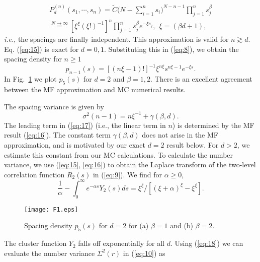\documentclass[reprint,amsmath,amssymb,showpacs,aps,]{revtex4-1}
\begin{document}
{\begin{eqnarray}\label{eq:15}
P_{d}^{(n)}(s_{1},\cdots,s_{n})= \tilde{C} \Big(N-\sum_{i=1}^{n}s_{i}\Big)^{N-n-1}\prod_{j=1}^{n}s_{j}^{\beta}\nonumber \\
\overset{N\rightarrow\infty}{=}\left[\xi^{\xi}(\xi!)^{-1}\right]^{n} \prod_{j=1}^{n} s_{j}^{\beta}e^{-\xi s_{j}}, ~~ \xi= (\beta d+1),
\end{eqnarray}
\textit{i.e.}, the spacings are finally independent. This approximation is valid for $n \gtrsim d$. Eq. (\ref{eq:15}) is exact for $d=0,1$. Substituting this in (\ref{eq:8}), we obtain the spacing density for $n\geq1$
\begin{equation}\label{eq:16}
p_{n-1}(s)= \left[(n\xi-1)!\right]^{-1} \xi^{n\xi} s^{n\xi -1}e^{-\xi s}.
\end{equation}
In Fig.~\ref{fig:F1} we plot $p_{5}(s)$ for $d=2$ and $\beta=1, 2$. There is an excellent agreement between the MF approximation and MC numerical results.\par
The spacing variance is given by
\begin{equation}\label{eq:17}
\sigma^{2}(n-1)={n}{\xi}^{-1} + \gamma(\beta,d).
\end{equation}
The leading term in (\ref{eq:17}) (i.e., the linear term in $n$) is determined by the MF result (\ref{eq:16}). The constant term $\gamma(\beta,d)$ does not arise in the MF approximation, and is motivated by our exact $d=2$ result below. For $d>2$, we estimate this constant from our MC calculations. To calculate the number variance, we use (\ref{eq:15}, \ref{eq:16}) to obtain the Laplace transform of the two-level correlation function $R_{2}(s)$ in (\ref{eq:9}). We find for $\alpha\geq 0$,
\begin{equation}\label{eq:18}
\frac{1}{\alpha}-\int_{0}^{\infty}e^{-\alpha s}Y_{2}(s)ds = {\xi}^{\xi}/[({\xi+\alpha})^{\xi}-{\xi}^{\xi}].
\end{equation}
\begin{figure}[h!]
\begin{center}
\texttt{[image: F1.eps]}
\caption{Spacing density $p_{5}(s)$ for $d=2$ for (a) $\beta=1$ and (b) $\beta=2$.}\label{fig:F1}
\end{center}
\end{figure}
The cluster function $Y_{2}$ falls off exponentially for all $d$. Using (\ref{eq:18}) we can evaluate the number variance $\Sigma^{2}(r)$ in (\ref{eq:10}) as
}
\end{document}
